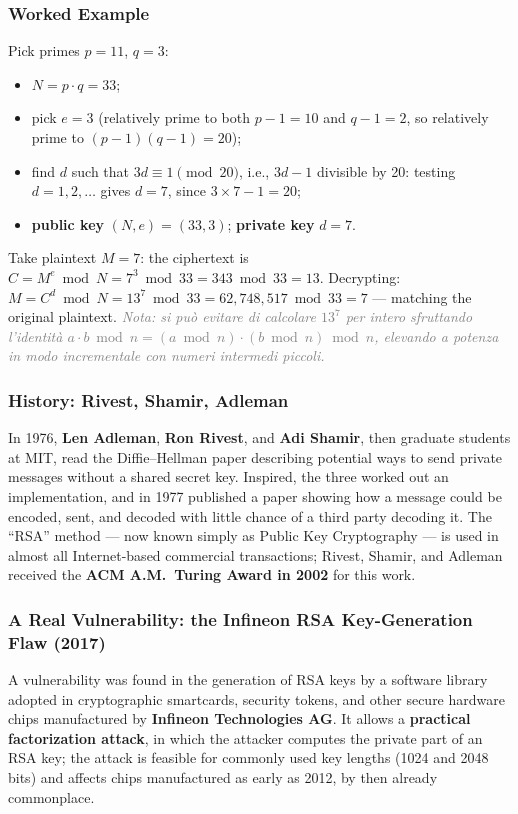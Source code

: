 \documentclass[12pt, a4paper]{article}
\begin{document}
\subsubsection{Worked Example}
Pick primes $p=11$, $q=3$:
\begin{itemize}
    \item $N = p\cdot q = 33$;
    \item pick $e=3$ (relatively prime to both $p-1=10$ and $q-1=2$, so relatively prime to $(p-1)(q-1)=20$);
    \item find $d$ such that $3d \equiv 1 \pmod{20}$, i.e., $3d - 1$ divisible by 20: testing $d=1,2,\dots$ gives $d=7$, since $3\times7-1=20$;
    \item \textbf{public key} $(N,e)=(33,3)$; \textbf{private key} $d=7$.
\end{itemize}
Take plaintext $M=7$: the ciphertext is $C = M^e \bmod N = 7^3 \bmod 33 = 343 \bmod 33 = 13$. Decrypting: $M = C^d \bmod N = 13^7 \bmod 33 = 62{,}748{,}517 \bmod 33 = 7$ --- matching the original plaintext. \textcolor{gray}{\textit{Nota: si può evitare di calcolare $13^7$ per intero sfruttando l'identità $a\cdot b \bmod n = (a \bmod n)\cdot(b \bmod n) \bmod n$, elevando a potenza in modo incrementale con numeri intermedi piccoli.}}

\subsubsection{History: Rivest, Shamir, Adleman}
In 1976, \textbf{Len Adleman}, \textbf{Ron Rivest}, and \textbf{Adi Shamir}, then graduate students at MIT, read the Diffie--Hellman paper describing potential ways to send private messages without a shared secret key. Inspired, the three worked out an implementation, and in 1977 published a paper showing how a message could be encoded, sent, and decoded with little chance of a third party decoding it. The ``RSA'' method --- now known simply as Public Key Cryptography --- is used in almost all Internet-based commercial transactions; Rivest, Shamir, and Adleman received the \textbf{ACM A.M.\ Turing Award in 2002} for this work.

\subsubsection{A Real Vulnerability: the Infineon RSA Key-Generation Flaw (2017)}
A vulnerability was found in the generation of RSA keys by a software library adopted in cryptographic smartcards, security tokens, and other secure hardware chips manufactured by \textbf{Infineon Technologies AG}. It allows a \textbf{practical factorization attack}, in which the attacker computes the private part of an RSA key; the attack is feasible for commonly used key lengths (1024 and 2048 bits) and affects chips manufactured as early as 2012, by then already commonplace.
\end{document}
